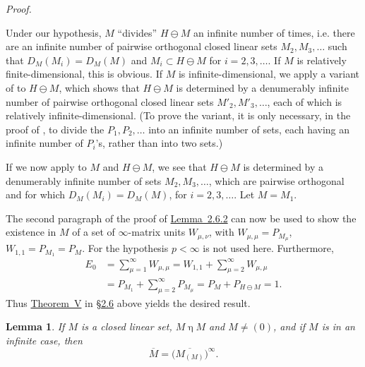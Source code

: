 \documentclass[b5paper,twoside]{article}
\newcommand{\secref}[2]{\hyperref[#1]{\mbox{\S#2}}}
\newcommand{\thmref}[2]{\hyperref[#1]{\mbox{Theorem~#2}}}
\newcommand{\lemref}[2]{\hyperref[#1]{\mbox{Lemma~#2}}}
\theoremstyle{mvnplain}
\newtheorem{lemma}{Lemma}[section]
\renewenvironment{proof}[1][Proof]{%
  \par\addvspace{0.35\baselineskip}%
  \noindent\textit{#1.}\ \normalfont\ignorespaces
}{%
  \par\addvspace{0.35\baselineskip}%
}
\newcommand{\M}{\mathbf M}
\newcommand{\Hilbert}{\mathfrak H}
\def\M{M}%
\def\Hilbert{H}%
\def\mathfrak#1{#1}%
\begin{document}
\begin{proof}
Under our hypothesis, \(\mathfrak M\) ``divides''
\(\Hilbert\ominus\mathfrak M\) an infinite number of times, i.e. there are an
infinite number of pairwise orthogonal closed linear sets
\(\mathfrak M_2,\mathfrak M_3,\ldots\) such that
\(D_{\M}(\mathfrak M_i)=D_{\M}(\mathfrak M)\) and
\(\mathfrak M_i\subset\Hilbert\ominus\mathfrak M\) for
\(i=2,3,\ldots\). If \(\mathfrak M\) is relatively finite-dimensional, this is
obvious. If \(\mathfrak M\) is infinite-dimensional, we apply a variant of
\cite[p.~157, Lemma~7.2.3]{ref5} to \(\Hilbert\ominus\mathfrak M\), which
shows that \(\Hilbert\ominus\mathfrak M\) is determined by a denumerably
infinite number of pairwise orthogonal closed linear sets
\(\mathfrak M'_2,\mathfrak M'_3,\ldots\), each of which is relatively
infinite-dimensional. (To prove the variant, it is only necessary, in the proof
of \cite[Lemma~7.2.3]{ref5}, to divide the
\(\mathfrak P_1,\mathfrak P_2,\ldots\) into an infinite number of sets, each
having an infinite number of \(\mathfrak P_i\)'s, rather than into two sets.)

If we now apply \cite[p.~155, Lemma~7.1.2]{ref5} to \(\mathfrak M\) and
\(\Hilbert\ominus\mathfrak M\), we see that
\(\Hilbert\ominus\mathfrak M\) is determined by a denumerably infinite
number of sets \(\mathfrak M_2,\mathfrak M_3,\ldots\), which are pairwise
orthogonal and for which
\(D_{\M}(\mathfrak M_i)=D_{\M}(\mathfrak M)\), for
\(i=2,3,\ldots\). Let \(\mathfrak M=\mathfrak M_1\).

The second paragraph of the proof of \lemref{lem:2.6.2}{2.6.2} can now be
used to show the existence in \(\M\) of a set of \(\infty\)-matrix units
\(W_{\mu,\nu}\), with
\(W_{\mu,\mu}=P_{\mathfrak M_\mu}\),
\(W_{1,1}=P_{\mathfrak M_1}=P_{\mathfrak M}\). For the hypothesis
\(p<\infty\) is not used here. Furthermore,
\[
\begin{aligned}
E_0&=\sum_{\mu=1}^{\infty}W_{\mu,\mu}
 =W_{1,1}+\sum_{\mu=2}^{\infty}W_{\mu,\mu}\\
&=P_{\mathfrak M_1}+\sum_{\mu=2}^{\infty}P_{\mathfrak M_\mu}
 =P_{\mathfrak M}+P_{\Hilbert\ominus\mathfrak M}=1.
\end{aligned}
\]
Thus \thmref{thm:V}{V} in \secref{sec:2.6}{2.6} above yields the desired
result.
\end{proof}

\begin{lemma}\label{lem:3.1.2}
If \(\mathfrak M\) is a closed linear set, \(\mathfrak M\mathrel{\eta}\M\) and
\(\mathfrak M\ne(0)\), and if \(\M\) is in an infinite case, then
\[
  \overline{\M}=\bigl(\overline{\M_{(\mathfrak M)}}\bigr)^{\infty}.
\]
\end{lemma}
\end{document}
